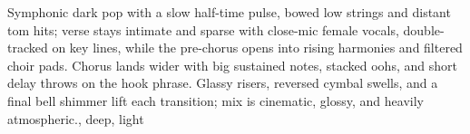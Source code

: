 

\begin{notes}
\end{notes}

\begin{style}
Symphonic dark pop with a slow half-time pulse, bowed low strings and distant tom hits; verse stays intimate and sparse with close-mic female vocals, double-tracked on key lines, while the pre-chorus opens into rising harmonies and filtered choir pads. %
Chorus lands wider with big sustained notes, stacked oohs, and short delay throws on the hook phrase. %
Glassy risers, reversed cymbal swells, and a final bell shimmer lift each transition; mix is cinematic, glossy, and heavily atmospheric., deep, light
\end{style}

